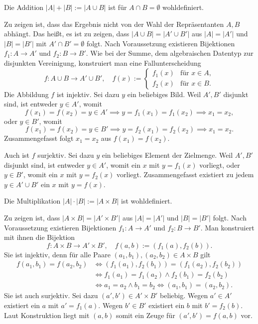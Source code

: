 \begin{Satz}
Die Addition $|A|+|B|:=|A\cup B|$ ist für $A\cap B=\emptyset$ wohldefiniert.
\end{Satz}
\begin{Beweis}
Zu zeigen ist, dass das Ergebnis nicht von der Wahl der Repräsentanten
$A,B$ abhängt. Das heißt, es ist zu zeigen, dass $|A\cup B|=|A'\cup B'|$
aus $|A|=|A'|$ und $|B|=|B'|$ mit $A'\cap B'=\emptyset$ folgt. Nach
Voraussetzung existieren Bijektionen $f_1\colon A\to A'$ und
$f_2\colon B\to B'$. Wie bei der Summe, dem algebraischen Datentyp
zur disjunkten Vereinigung, konstruiert man eine Fallunterscheidung
\[f\colon A\cup B\to A'\cup B',\quad f(x) :=
\begin{cases}
f_1(x) & \text{für $x\in A$},\\
f_2(x) & \text{für $x\in B$}.
\end{cases}\]
Die Abbildung $f$ ist injektiv. Sei dazu $y$ ein beliebiges Bild.
Weil $A',B'$ disjunkt sind, ist entweder $y\in A'$, womit
\[f(x_1)=f(x_2)=y\in A' \implies y=f_1(x_1)=f_1(x_2)\implies x_1=x_2,\]
oder $y\in B'$, womit
\[f(x_1)=f(x_2)=y\in B' \implies y=f_2(x_1)=f_2(x_2)\implies x_1=x_2. \]
Zusammengefasst folgt $x_1=x_2$ aus $f(x_1)=f(x_2)$.

Auch ist $f$ surjektiv. Sei dazu $y$ ein beliebiges Element der Zielmenge.
Weil $A',B'$ disjunkt sind, ist entweder $y\in A'$, womit ein $x$ mit
$y=f_1(x)$ vorliegt, oder $y\in B'$, womit ein $x$ mit $y=f_2(x)$
vorliegt. Zusammengefasst existiert zu jedem $y\in A'\cup B'$ ein $x$
mit $y=f(x)$.\,\qedsymbol
\end{Beweis}

\begin{Satz}
Die Multiplikation $|A|\cdot |B| := |A\times B|$ ist wohldefiniert.
\end{Satz}
\begin{Beweis}
Zu zeigen ist, dass $|A\times B|=|A'\times B'|$ aus $|A|=|A'|$
und $|B|=|B'|$ folgt. Nach Voraussetzung existieren Bijektionen
$f_1\colon A\to A'$ und $f_2\colon B\to B'$. Man konstruiert mit ihnen
die Bijektion
\[f\colon A\times B\to A'\times B',\quad f(a,b) := (f_1(a),f_2(b)).\]
Sie ist injektiv, denn für alle Paare $(a_1,b_1),(a_2,b_2)\in A\times B$ gilt
\begin{align*}
f(a_1,b_1) = f(a_2,b_2) &\iff (f_1(a_1),f_2(b_1)) = (f_1(a_2), f_2(b_2))\\
&\iff f_1(a_1)=f_1(a_2)\land f_2(b_1)=f_2(b_2)\\
&\iff a_1=a_2\land b_1=b_2\iff (a_1,b_1) = (a_2,b_2).
\end{align*}
Sie ist auch surjektiv. Sei dazu $(a',b')\in A'\times B'$ beliebig.
Wegen $a'\in A'$ existiert ein $a$ mit $a'=f_1(a)$. Wegen $b'\in B'$
existiert ein $b$ mit $b'=f_2(b)$. Laut Konstruktion liegt mit $(a,b)$
somit ein Zeuge für $(a',b')=f(a,b)$ vor.\,\qedsymbol
\end{Beweis}

